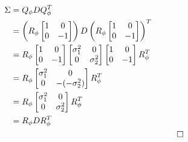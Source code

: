 \documentclass[a4paper, 12pt]{report}
\begin{document}
\begin{align}
	\Sigma&=Q_\phi DQ_\phi ^T \\
	&= \left(R_\phi \begin{bmatrix}
		1  &  0  \\
		0  &  -1
	\end{bmatrix}\right)D\left(R_\phi \begin{bmatrix}
		1  &  0  \\
		0  &  -1
	\end{bmatrix}\right)^T \\
	&= R_\phi \begin{bmatrix}
		1  &  0  \\
		0  &  -1
	\end{bmatrix} \begin{bmatrix}
		\sigma_1^2  &  0  \\
		0  &  \sigma_2^2
	\end{bmatrix} \begin{bmatrix}
		1  &  0  \\
		0  &  -1
	\end{bmatrix} R_\phi^T \\
	&= R_\phi \begin{bmatrix}
		\sigma_1^2  &  0  \\
		0  &  -(-\sigma_2^2)
	\end{bmatrix} R_\phi^T \\
	&= R_\phi \begin{bmatrix}
		\sigma_1^2  &  0  \\
		0  &  \sigma_2^2
	\end{bmatrix} R_\phi^T \\
	&= R_\phi D R_\phi^T \\&&\qed\nonumber
\end{align}


\newpage
\end{document}
